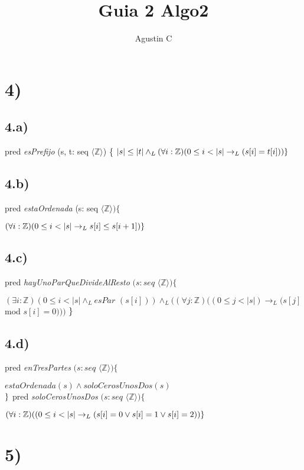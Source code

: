 \documentclass{article}
\title{Guia 2 Algo2}
\author{Agustin C}
\newcommand{\italica}[1]{\textit{#1}}
\newcommand{\conjuntito}[1]{\langle #1 \rangle}
\newcommand{\enteros}[0]{\mathbb{Z}}
\newcommand{\implicaL}[0]{\rightarrow_L}
\begin{document}
\maketitle
\section*{4)}
\subsection*{4.a)}
pred \italica{esPrefijo} (s, t: seq  $ \conjuntito{\enteros}$) 
\{ 
$ \\ |s| \leq |t| \land_L (\forall i:\enteros) 
(0 \leq i < |s| \implicaL (s[i] = t[i])) \\ \}$
\subsection*{4.b)}
pred \italica{estaOrdenada} (s: seq  
$\conjuntito{\enteros}) \{$

$(\forall i:\enteros) (0 \leq i < |s| \implicaL s[i] \leq s[i + 1] ) \\ \}$
\subsection*{4.c)}
pred \italica{hayUnoParQueDivideAlResto} $ (s: seq$
$\conjuntito{\enteros}) \{ $ 

$(\exists i:\enteros) (0 \leq i < |s| \land_L \italica{esPar }(s[i]))
\land_L ((\forall j: \enteros)((0 \leq j < |s|) \implicaL (s[j]$  mod  $ s[i] = 0)))$
$ \\ \} $

\subsection*{4.d)}
pred \italica{enTresPartes} $ (s: seq$
$\conjuntito{\enteros}) \{ $ 

$ estaOrdenada(s) \land soloCerosUnosDos(s) $ \\ $\} \\$
pred \italica{soloCerosUnosDos} $ (s: seq$
$\conjuntito{\enteros}) \{ $ 

$(\forall i: \enteros) ((0 \leq i < |s| \implicaL 
(s[i] = 0 \vee s[i] = 1 \vee s[i] = 2)) \\ \}$

\section*{5)}
\end{document}
